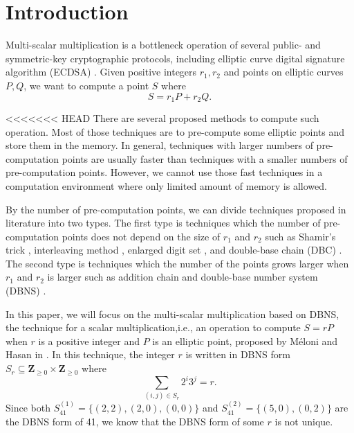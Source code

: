 \section{Introduction}

Multi-scalar multiplication is a bottleneck operation of several public- and symmetric-key cryptographic protocols,
including elliptic curve digital signature algorithm (ECDSA) \cite{ECDSA}.
Given positive integers $r_1, r_2$ and points on elliptic curves $P, Q$,
we want to compute a point $S$ where
$$S = r_1 P + r_2 Q.$$

<<<<<<< HEAD
There are several proposed methods to compute such operation.
Most of those techniques are to pre-compute some elliptic points  and store them in the memory.
In general, techniques with larger numbers of pre-computation points are usually faster than techniques with a smaller numbers of pre-computation points.
However, we cannot use those fast techniques in a computation environment where only limited amount of memory is allowed.

By the number of pre-computation points, we can divide techniques proposed in literature into two types.
The first type is techniques which the number of pre-computation points does not depend on the size of $r_1$ and $r_2$ such as Shamir’s trick \cite{Shamir},
interleaving method \cite{interleaving}, enlarged digit set \cite{enlarged2,enlarged4,enlarged1,enlarged3}, and double-base chain (DBC) \cite{dbc2,dbc3,dbc1}.
The second type is techniques which the number of the points grows larger when $r_1$ and $r_2$ is larger such as addition chain \cite{additionChain1,additionChain2}
and double-base number system (DBNS)  \cite{dbns}.

In this paper, we will focus on the multi-scalar multiplication based on DBNS,
the technique for a scalar multiplication,i.e., an operation to compute $S = rP$ when $r$ is a positive integer and $P$ is an elliptic point, proposed by M\'eloni and Hasan in \cite{dbns}.
In this technique, the integer $r$ is written in DBNS form $S_r \subseteq \mathbf{Z}_{\geq 0} \times \mathbf{Z}_{\geq 0}$ where
$$\sum_{(i,j) \in S_r} 2^i 3^j = r.$$ 
Since both $S^{(1)}_{41} = \{(2,2), (2,0), (0,0)\}$ and $S^{(2)}_{41} = \{(5,0), (0,2)\}$ are the DBNS form of 41, we know that the DBNS form of some $r$ is not unique.

